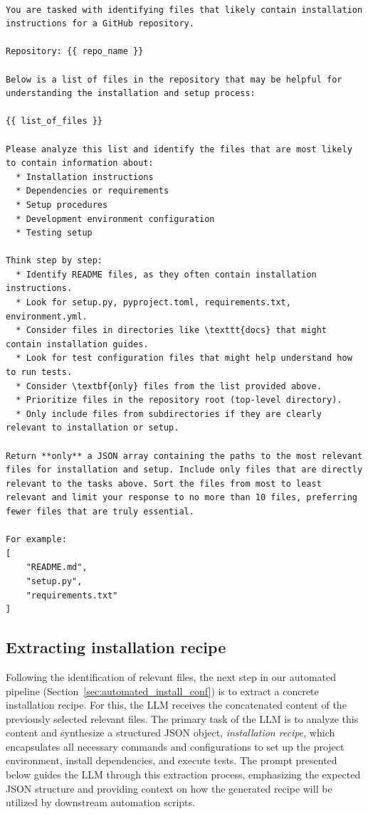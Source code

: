 \documentclass[dandb]{article}
\begin{document}
\begin{lstlisting}[upquote=true,caption=LLM prompt for identifying installation-related files]

You are tasked with identifying files that likely contain installation instructions for a GitHub repository.

Repository: {{ repo_name }}

Below is a list of files in the repository that may be helpful for understanding the installation and setup process:

{{ list_of_files }}

Please analyze this list and identify the files that are most likely to contain information about:
  * Installation instructions
  * Dependencies or requirements
  * Setup procedures
  * Development environment configuration
  * Testing setup

Think step by step:
  * Identify README files, as they often contain installation instructions.
  * Look for setup.py, pyproject.toml, requirements.txt, environment.yml.
  * Consider files in directories like \texttt{docs} that might contain installation guides.
  * Look for test configuration files that might help understand how to run tests.
  * Consider \textbf{only} files from the list provided above.
  * Prioritize files in the repository root (top-level directory).
  * Only include files from subdirectories if they are clearly relevant to installation or setup.

Return **only** a JSON array containing the paths to the most relevant files for installation and setup. Include only files that are directly relevant to the tasks above. Sort the files from most to least relevant and limit your response to no more than 10 files, preferring fewer files that are truly essential.

For example:
[
    "README.md",
    "setup.py",
    "requirements.txt"
]
\end{lstlisting}

\subsection{Extracting installation recipe}

Following the identification of relevant files, the next step in our automated pipeline (Section~\ref{sec:automated_install_conf}) is to extract a concrete installation recipe. For this, the LLM receives the concatenated content of the previously selected relevant files. The primary task of the LLM is to analyze this content and synthesize a structured JSON object, \textit{installation recipe}, which encapsulates all necessary commands and configurations to set up the project environment, install dependencies, and execute tests. The prompt presented below guides the LLM through this extraction process, emphasizing the expected JSON structure and providing context on how the generated recipe will be utilized by downstream automation scripts.
\end{document}
